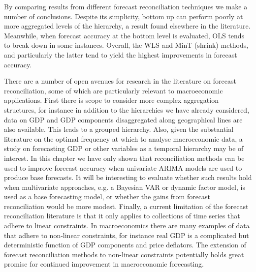 \documentclass[graybox]{svmult}
\begin{document}
By comparing results from different forecast reconciliation techniques we make a number of conclusions.  Despite its simplicity, bottom up can perform poorly at more aggregated levels of the hierarchy, a result found elsewhere in the literature. Meanwhile, when forecast accuracy at the bottom level is evaluated, OLS tends to break down in some instances.  Overall, the WLS and MinT (shrink) methods, and particularly the latter tend to yield the highest improvements in forecast accuracy.

There are a number of open avenues for research in the literature on forecast reconciliation, some of which are particularly relevant to macroeconomic applications.  First there is scope to consider more complex aggregation structures, for instance in addition to the hierarchies we have already considered, data on GDP and GDP components disaggregated along geographical lines are also available.  This leads to a grouped hierarchy.  Also, given the substantial literature on the optimal frequency at which to analyse macroeconomic data, a study on forecasting GDP or other variables as a temporal hierarchy may be of interest.  In this chapter we have only shown that reconciliation methods can be used to improve forecast accuracy when univariate ARIMA models are used to produce base forecasts.  It will be interesting to evaluate whether such results hold when multivariate approaches, e.g. a Bayesian VAR or dynamic factor model, is used as a base forecasting model, or whether the gains from forecast reconciliation would be more modest.  Finally, a current limitation of the forecast reconciliation literature is that it only applies to collections of time series that adhere to linear constraints.  In macroeconomics there are many examples of data that adhere to non-linear constraints, for instance real GDP is a complicated but deterministic function of GDP components and price deflators.  The extension of forecast reconciliation methods to non-linear constraints potentially holds great promise for continued improvement in macroeconomic forecasting.
\end{document}
